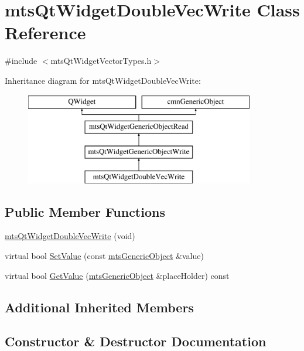 \hypertarget{classmts_qt_widget_double_vec_write}{}\section{mts\+Qt\+Widget\+Double\+Vec\+Write Class Reference}
\label{classmts_qt_widget_double_vec_write}


{\ttfamily \#include $<$mts\+Qt\+Widget\+Vector\+Types.\+h$>$}

Inheritance diagram for mts\+Qt\+Widget\+Double\+Vec\+Write\+:\begin{figure}[H]
\begin{center}
\leavevmode
\includegraphics[height=4.000000cm]{df/d78/classmts_qt_widget_double_vec_write}
\end{center}
\end{figure}
\subsection*{Public Member Functions}
\begin{DoxyCompactItemize}
\item 
\hyperlink{classmts_qt_widget_double_vec_write_a38e20f0c568ff888913a57c58fe34ce7}{mts\+Qt\+Widget\+Double\+Vec\+Write} (void)
\item 
virtual bool \hyperlink{classmts_qt_widget_double_vec_write_acff9753bae2e9ad21c9fca44f26c0300}{Set\+Value} (const \hyperlink{classmts_generic_object}{mts\+Generic\+Object} \&value)
\item 
virtual bool \hyperlink{classmts_qt_widget_double_vec_write_a5cb891b8a87d397f69afa584f5eff298}{Get\+Value} (\hyperlink{classmts_generic_object}{mts\+Generic\+Object} \&place\+Holder) const 
\end{DoxyCompactItemize}
\subsection*{Additional Inherited Members}


\subsection{Constructor \& Destructor Documentation}
\hypertarget{classmts_qt_widget_double_vec_write_a38e20f0c568ff888913a57c58fe34ce7}{}
